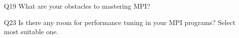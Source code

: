 \begin{description}%
\item{Q19} What are your obstacles to mastering MPI?%
\item{Q23} Is there any room for performance tuning in your MPI programs? Select most suitable one.%
\end{description}%
